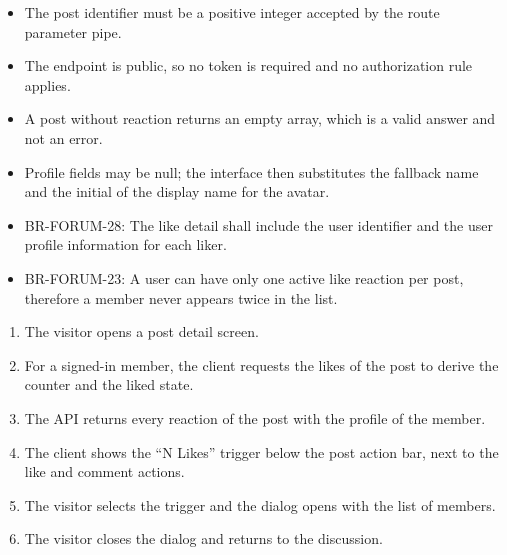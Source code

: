 \begin{itemize}[leftmargin=1.6em,topsep=3pt,itemsep=2pt,parsep=0pt,label=$\bullet$]
      \item The post identifier must be a positive integer accepted by the route parameter
            pipe.
      \item The endpoint is public, so no token is required and no authorization rule
            applies.
      \item A post without reaction returns an empty array, which is a valid answer and not
            an error.
      \item Profile fields may be null; the interface then substitutes the fallback name
            and the initial of the display name for the avatar.
\end{itemize}

\begin{itemize}[leftmargin=1.6em,topsep=3pt,itemsep=2pt,parsep=0pt,label=$\bullet$]\brrulelist
      \item BR-FORUM-28: The like detail shall include the user identifier and the user
            profile information for each liker.
      \item BR-FORUM-23: A user can have only one active like reaction per post, therefore
            a member never appears twice in the list.
\end{itemize}

\begin{enumerate}[leftmargin=1.8em,topsep=3pt,itemsep=2pt,parsep=0pt]
      \item The visitor opens a post detail screen.
      \item For a signed-in member, the client requests the likes of the post to derive the
            counter and the liked state.
      \item The API returns every reaction of the post with the profile of the member.
      \item The client shows the ``N Likes'' trigger below the post action bar, next to the
            like and comment actions.
      \item The visitor selects the trigger and the dialog opens with the list of members.
      \item The visitor closes the dialog and returns to the discussion.
\end{enumerate}

